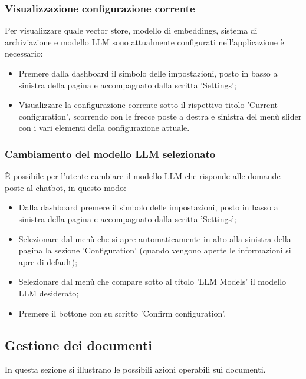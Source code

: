 \documentclass[10pt, a4paper]{article}
\begin{document}
\subsubsection{Visualizzazione configurazione corrente}
Per visualizzare quale vector store, modello di embeddings, sistema di archiviazione e modello LLM sono attualmente configurati nell'applicazione è necessario:
\begin{itemize}
    \item Premere dalla dashboard il simbolo delle impostazioni, posto in basso a sinistra della pagina e accompagnato dalla scritta 'Settings';
    \item Visualizzare la configurazione corrente sotto il rispettivo titolo 'Current configuration', scorrendo con le frecce poste a destra e sinistra del menù slider con i vari elementi della configurazione attuale.
\end{itemize}

\subsubsection{Cambiamento del modello LLM selezionato}
È possibile per l'utente cambiare il modello LLM che risponde alle domande poste al chatbot, in questo modo:
\begin{itemize}
    \item Dalla dashboard premere il simbolo delle impostazioni, posto in basso a sinistra della pagina e accompagnato dalla scritta 'Settings';
    \item Selezionare dal menù che si apre automaticamente in alto alla sinistra della pagina la sezione 'Configuration' (quando vengono aperte le informazioni si apre di default);
    \item Selezionare dal menù che compare sotto al titolo 'LLM Models' il modello LLM desiderato;
    \item Premere il bottone con su scritto 'Confirm configuration'.
\end{itemize}

\subsection{Gestione dei documenti}
In questa sezione si illustrano le possibili azioni operabili sui documenti.
\end{document}
